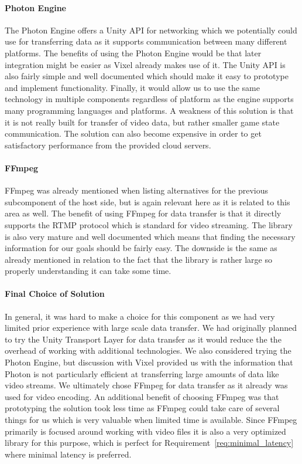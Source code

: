 \paragraph{Photon Engine}
The Photon Engine\cite{photon_homepage} offers a Unity API for networking which we potentially could use for transferring data as it supports communication between many different platforms. The benefits of using the Photon Engine would be that later integration might be easier as Vixel already makes use of it. The Unity API is also fairly simple and well documented which should make it easy to prototype and implement functionality. Finally, it would allow us to use the same technology in multiple components regardless of platform as the engine supports many programming languages and platforms. A weakness of this solution is that it is not really built for transfer of video data, but rather smaller game state communication. The solution can also become expensive in order to get satisfactory performance from the provided cloud servers. 

\paragraph{FFmpeg}
FFmpeg was already mentioned when listing alternatives for the previous subcomponent of the host side, but is again relevant here as it is related to this area as well. The benefit of using FFmpeg for data transfer is that it directly supports the RTMP protocol which is standard for video streaming. The library is also very mature and well documented which means that finding the necessary information for our goals should be fairly easy. The downside is the same as already mentioned in relation to the fact that the library is rather large so properly understanding it can take some time. 

\paragraph{Final Choice of Solution}
In general, it was hard to make a choice for this component as we had very limited prior experience with large scale data transfer. We had originally planned to try the Unity Transport Layer for data transfer as it would reduce the the overhead of working with additional technologies. We also considered trying the Photon Engine, but discussion with Vixel provided us with the information that Photon is not particularly efficient at transferring large amounts of data like video streams. We ultimately chose FFmpeg for data transfer as it already was used for video encoding. An additional benefit of choosing FFmpeg was that prototyping the solution took less time as FFmpeg could take care of several things for us which is very valuable when limited time is available. Since FFmpeg primarily is focused around working with video files it is also a very optimized library for this purpose, which is perfect for Requirement~\ref{req:minimal_latency} where minimal latency is preferred. 


